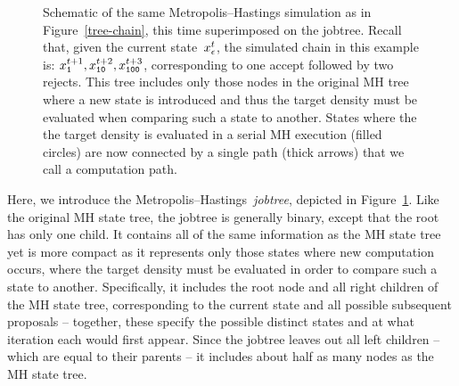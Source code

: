 \documentclass[angelino.tex]{subfiles}
\begin{document}
\begin{figure}[t!]
  \centering%
  \caption{Schematic of the same Metropolis--Hastings simulation as in
  Figure~\ref{tree-chain}, this time superimposed on the jobtree.
  Recall that, given the current state~$x^t_\epsilon$, the simulated chain in
  this example is: $x^{t+1}_{\texttt{1}}, x^{t+2}_{\texttt{10}}, x^{t+3}_{\texttt{100}}$,
  corresponding to one accept followed by two rejects. 
  This tree includes only those nodes in the original MH tree
  where a new state is introduced and thus the target density must be evaluated
  when comparing such a state to another.
  States where the the target density is evaluated in a serial MH execution
  (filled circles) are now connected by a single path (thick arrows)
  that we call a computation path.
}
  \label{jobtree}
\end{figure}

Here, we introduce the Metropolis--Hastings~\emph{jobtree}, depicted in 
Figure~\ref{jobtree}.
Like the original MH state tree, the jobtree is generally binary, except that
the root has only one child.
It contains all of the same information as the MH state tree yet is more compact
as it represents only those states where new computation occurs, \ie where the
target density must be evaluated in order to compare such a state to another.
Specifically, it includes the root node and all right children of the MH
state tree, corresponding to the current state and all possible subsequent
proposals -- together, these specify the possible distinct states and at what 
iteration each would first appear.
Since the jobtree leaves out all left children -- which are equal to their
parents -- it includes about half as many nodes as the MH state tree.
\end{document}
